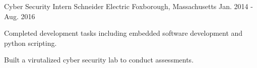 \begin{cventries}
  \cventry
    {Cyber Security Intern} %
    {Schneider Electric} %
    {Foxborough, Massachusetts} %
    {Jan. 2014 - Aug. 2016} %
    {
      \begin{cvitems} %
        \item {
            Completed development tasks including embedded software development and python scripting.
        }
        \item {
            Built a virutalized cyber security lab to conduct assessments.
        }
      \end{cvitems}
    }

\end{cventries}

